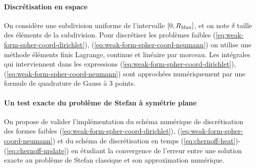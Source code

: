 \paragraph{Discrétisation en espace}
On considère une subdivision uniforme de l'intervalle $[0, R_\mathrm{Max}]$, et
on note $\delta$ taille des éléments de la subdivision. Pour
discrétiser les problèmes faibles
(\ref{eq:weak-form-spher-coord-dirichlet}),
(\ref{eq:weak-form-spher-coord-neumann}) on utilise une méthode
éléments finis Lagrange, continue et linéaire par morceau. Les
intégrales qui interviennent dans les expressions
(\ref{eq:weak-form-spher-coord-dirichlet}),
(\ref{eq:weak-form-spher-coord-neumann}) sont approchées numériquement
par une formule de quadrature de Gauss à 3 points.



\paragraph{Un test exacte du problème de Stefan à symétrie plane}
On propose de valider l'implémentation du schéma numérique de
discrétisation des formes faibles
(\ref{eq:weak-form-spher-coord-dirichlet}),
(\ref{eq:weak-form-spher-coord-neumann}) et du schéma de
discrétisation en temps
(\ref{eq:chernoff-heat})-(\ref{eq:chernoff-update}) en étudiant la
convergence de l'erreur entre une solution exacte au problème de
Stefan classique et son approximation numérique.


